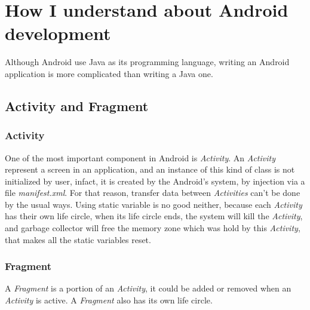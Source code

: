 \chapter{How I understand about Android development}

Although Android use Java as its programming language, writing an Android application is more complicated than writing a Java one.

\section{Activity and Fragment}

\subsection{Activity}
One of the most important component in Android is \textit{Activity}. An \textit{Activity} represent a screen in an application, and an instance of this kind of class is not initialized by user, infact, it is created by the Android's system, by injection via a file \textit{manifest.xml}. For that reason, transfer data between \textit{Activities} can't be done by the usual ways. Using static variable is no good neither, because each \textit{Activity} has their own life circle, when its life circle ends, the system will kill the \textit{Activity}, and garbage collector will free the memory zone which was hold by this \textit{Activity}, that makes all the static variables reset. 
\subsection{Fragment}
A \textit{Fragment} is a portion of an \textit{Activity}, it could be added or removed when an \textit{Activity} is active. A \textit{Fragment} also has its own life circle.